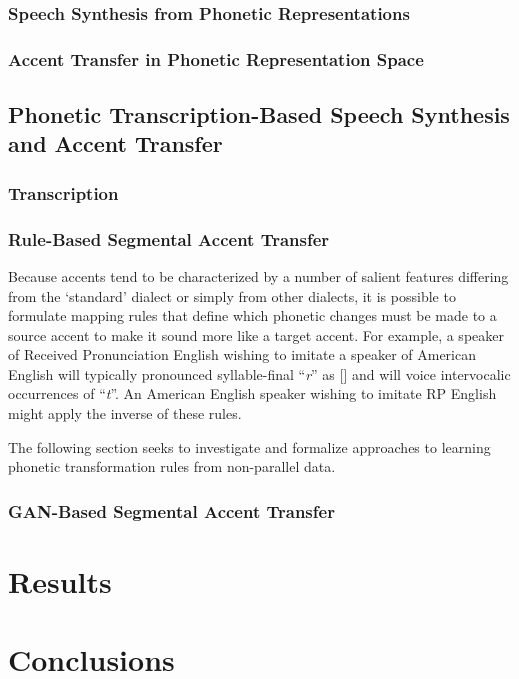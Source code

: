 \documentclass[12pt,leqno,a4paper]{article}
\begin{document}
\subsubsection{Speech Synthesis from Phonetic Representations}


\subsubsection{Accent Transfer in Phonetic Representation Space}


\subsection{Phonetic Transcription-Based Speech Synthesis and Accent Transfer}
\subsubsection{Transcription}


\subsubsection{Rule-Based Segmental Accent Transfer}
Because accents tend to be characterized by a number of salient features differing
from the `standard' dialect or simply from other dialects, it is possible to formulate
mapping rules that define which phonetic changes must be made to a source accent to make it sound
more like a target accent. For example, a speaker of Received Pronunciation English wishing 
to imitate a speaker of American English will typically pronounced syllable-final ``\textit{r}'' 
as [] and will voice intervocalic occurrences of ``\textit{t}''. An American English 
speaker wishing to imitate RP English might apply the inverse of these rules. 

The following section seeks to investigate and formalize approaches to learning 
phonetic transformation rules from non-parallel data.

\subsubsection{GAN-Based Segmental Accent Transfer}

\section{Results}


\section{Conclusions}




\end{document}
